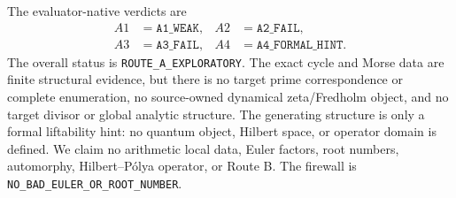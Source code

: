 \documentclass[10pt]{article}
\begin{document}
The evaluator-native verdicts are
\[
 \begin{aligned}
 A1&=\texttt{A1\_WEAK}, & A2&=\texttt{A2\_FAIL},\\
 A3&=\texttt{A3\_FAIL}, & A4&=\texttt{A4\_FORMAL\_HINT}.
 \end{aligned}
\]
The overall status is \texttt{ROUTE\_A\_EXPLORATORY}.  The exact cycle and
Morse data are finite
structural evidence, but there is no target prime correspondence or complete
enumeration, no source-owned dynamical zeta/Fredholm object, and no target
divisor or global analytic structure.  The generating structure is only a
formal liftability hint: no quantum object, Hilbert space, or operator domain
is defined.  We claim no arithmetic local data, Euler factors, root numbers,
automorphy, Hilbert--P\'olya operator, or Route B.  The firewall is
\texttt{NO\_BAD\_EULER\_OR\_ROOT\_NUMBER}.
\end{document}
